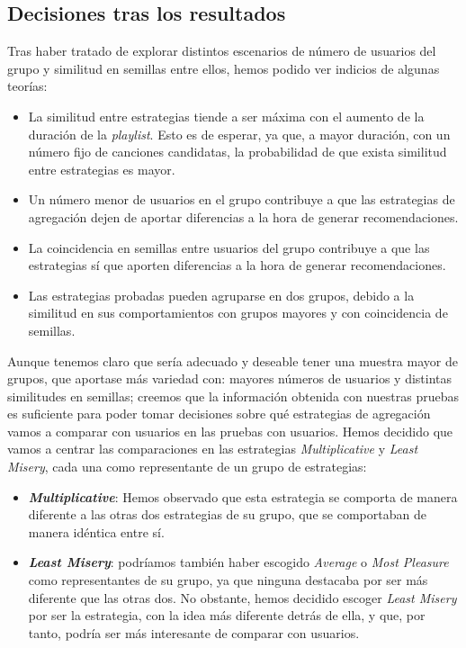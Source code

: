 \subsection{Decisiones tras los resultados\label{SEC:DECISIONES_TRAS_RESULTADOS}}

Tras haber tratado de explorar distintos escenarios de número de usuarios del grupo y similitud en semillas entre ellos, hemos podido
ver indicios de algunas teorías:

\begin{itemize}
    \item La similitud entre estrategias tiende a ser máxima con el aumento de la duración de la \textit{playlist}. Esto es de esperar, ya que, a mayor duración, 
    con un número fijo de canciones candidatas, la probabilidad de que exista similitud entre estrategias es mayor.
    \item Un número menor de usuarios en el grupo contribuye a que las estrategias de agregación dejen de aportar diferencias a la hora de generar recomendaciones.
    \item La coincidencia en semillas entre usuarios del grupo contribuye a que las estrategias sí que aporten diferencias a la hora de generar recomendaciones.
    \item Las estrategias probadas pueden agruparse en dos grupos, debido a la similitud en sus comportamientos con grupos mayores y con coincidencia
    de semillas.
\end{itemize}

Aunque tenemos claro que sería adecuado y deseable tener una muestra mayor de grupos, que aportase más variedad con: mayores números de usuarios y distintas similitudes en semillas;
creemos que la información obtenida con nuestras pruebas es suficiente para poder tomar decisiones sobre qué estrategias de agregación vamos a comparar con usuarios en las pruebas con usuarios.
Hemos decidido que vamos a centrar las comparaciones en las estrategias \textit{Multiplicative} y \textit{Least Misery}, cada una como representante de un 
grupo de estrategias:

\begin{itemize}
    \item \textbf{\textit{Multiplicative}}: Hemos observado que esta estrategia se comporta de manera diferente a las otras dos estrategias de su grupo, que se comportaban de 
    manera idéntica entre sí. 
    \item \textbf{\textit{Least Misery}}: podríamos también haber escogido \textit{Average} o \textit{Most Pleasure} como representantes de su grupo, ya que ninguna destacaba por ser
    más diferente que las otras dos. No obstante, hemos decidido escoger \textit{Least Misery} por ser la estrategia, con la idea más diferente detrás de ella, y que, por tanto,
    podría ser más interesante de comparar con usuarios.
\end{itemize}